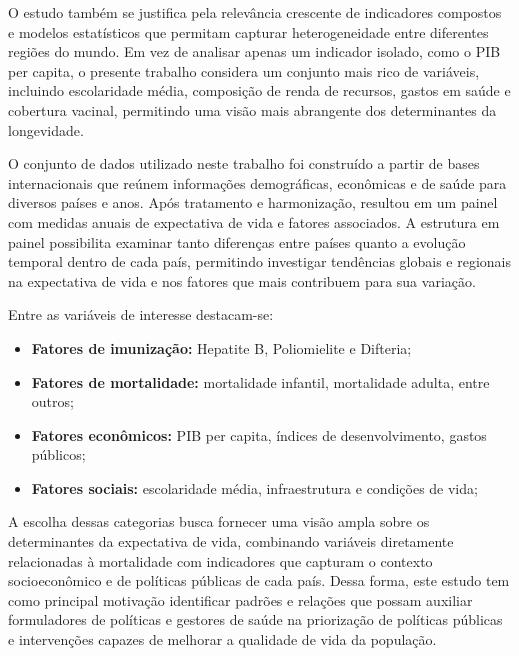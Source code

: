 \documentclass[
  12pt,
]{article}
\providecommand{\tightlist}{%
  \setlength{\itemsep}{0pt}\setlength{\parskip}{0pt}}
\begin{document}
O estudo também se justifica pela relevância crescente de indicadores
compostos e modelos estatísticos que permitam capturar heterogeneidade
entre diferentes regiões do mundo. Em vez de analisar apenas um
indicador isolado, como o PIB per capita, o presente trabalho considera
um conjunto mais rico de variáveis, incluindo escolaridade média,
composição de renda de recursos, gastos em saúde e cobertura vacinal,
permitindo uma visão mais abrangente dos determinantes da longevidade.

O conjunto de dados utilizado neste trabalho foi construído a partir de
bases internacionais que reúnem informações demográficas, econômicas e
de saúde para diversos países e anos. Após tratamento e harmonização,
resultou em um painel com medidas anuais de expectativa de vida e
fatores associados. A estrutura em painel possibilita examinar tanto
diferenças entre países quanto a evolução temporal dentro de cada país,
permitindo investigar tendências globais e regionais na expectativa de
vida e nos fatores que mais contribuem para sua variação.

Entre as variáveis de interesse destacam-se:

\begin{itemize}
\tightlist
\item
  \textbf{Fatores de imunização:} Hepatite B, Poliomielite e Difteria;\\
\item
  \textbf{Fatores de mortalidade:} mortalidade infantil, mortalidade
  adulta, entre outros;\\
\item
  \textbf{Fatores econômicos:} PIB per capita, índices de
  desenvolvimento, gastos públicos;\\
\item
  \textbf{Fatores sociais:} escolaridade média, infraestrutura e
  condições de vida;
\end{itemize}

A escolha dessas categorias busca fornecer uma visão ampla sobre os
determinantes da expectativa de vida, combinando variáveis diretamente
relacionadas à mortalidade com indicadores que capturam o contexto
socioeconômico e de políticas públicas de cada país. Dessa forma, este
estudo tem como principal motivação identificar padrões e relações que
possam auxiliar formuladores de políticas e gestores de saúde na
priorização de políticas públicas e intervenções capazes de melhorar a
qualidade de vida da população.
\end{document}
